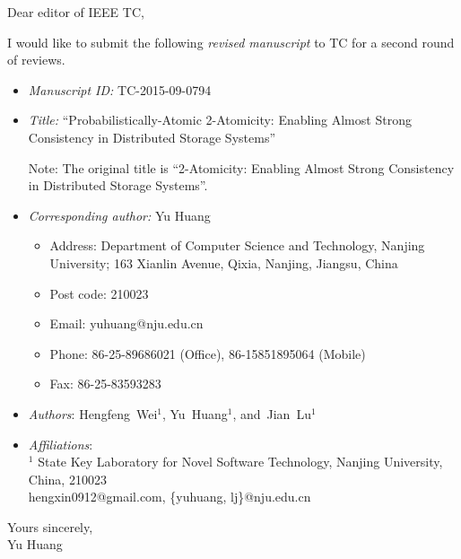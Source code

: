 \documentclass{letter}
\begin{document}
\begin{letter}
\opening{Dear editor of IEEE TC,}

I would like to submit the following \emph{revised manuscript} to TC for a second round of reviews.

\begin{itemize}
  \item \emph{Manuscript ID:} TC-2015-09-0794
  \item \emph{Title:} ``Probabilistically-Atomic 2-Atomicity: Enabling Almost Strong Consistency in
    Distributed Storage Systems''

    {\small Note: The original title is ``2-Atomicity: Enabling Almost Strong Consistency in Distributed
    Storage Systems''.}
  \item \emph{Corresponding author:} Yu Huang
    \begin{itemize}
      \item Address: Department of Computer Science and Technology, Nanjing University;
        163 Xianlin Avenue, Qixia, Nanjing, Jiangsu, China
      \item Post code: 210023
      \item Email: yuhuang@nju.edu.cn
      \item Phone: 86-25-89686021 (Office), 86-15851895064 (Mobile)
      \item Fax: 86-25-83593283
    \end{itemize}
  \item \emph{Authors}: Hengfeng~Wei$^{1}$, Yu~Huang$^{1}$, and~Jian~Lu$^{1}$
  \item \emph{Affiliations}: \\
        $^1$ State Key Laboratory for Novel Software Technology, Nanjing University, China, 210023 \\
        hengxin0912@gmail.com, \{yuhuang, lj\}@nju.edu.cn
\end{itemize}
\closing{Yours sincerely, \\ Yu Huang}
\end{letter}
\end{document}
